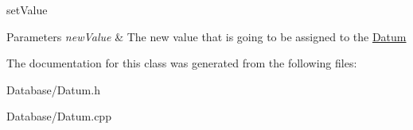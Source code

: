 set\+Value 


\begin{DoxyParams}{Parameters}
{\em new\+Value} & The new value that is going to be assigned to the \hyperlink{classDatabase_1_1Datum}{Datum} \\
\hline
\end{DoxyParams}


The documentation for this class was generated from the following files\+:\begin{DoxyCompactItemize}
\item 
Database/Datum.\+h\item 
Database/Datum.\+cpp\end{DoxyCompactItemize}
